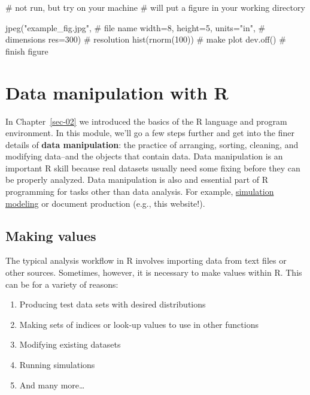 \documentclass[
  13,
  letterpaper,
]{report}
\newenvironment{Shaded}{\begin{snugshade}}{\end{snugshade}}
\newcommand{\AttributeTok}[1]{\textcolor[rgb]{0.40,0.45,0.13}{#1}}
\newcommand{\CommentTok}[1]{\textcolor[rgb]{0.37,0.37,0.37}{#1}}
\newcommand{\DecValTok}[1]{\textcolor[rgb]{0.68,0.00,0.00}{#1}}
\newcommand{\FunctionTok}[1]{\textcolor[rgb]{0.28,0.35,0.67}{#1}}
\newcommand{\NormalTok}[1]{\textcolor[rgb]{0.00,0.23,0.31}{#1}}
\newcommand{\StringTok}[1]{\textcolor[rgb]{0.13,0.47,0.30}{#1}}
\begin{document}
\begin{Shaded}
\begin{Highlighting}[]
\CommentTok{\# not run, but try on your machine}
\CommentTok{\# will put a figure in your working directory}

\FunctionTok{jpeg}\NormalTok{(}\StringTok{"example\_fig.jpg"}\NormalTok{,             }\CommentTok{\# file name}
     \AttributeTok{width=}\DecValTok{8}\NormalTok{, }\AttributeTok{height=}\DecValTok{5}\NormalTok{, }\AttributeTok{units=}\StringTok{"in"}\NormalTok{, }\CommentTok{\# dimensions}
     \AttributeTok{res=}\DecValTok{300}\NormalTok{)                       }\CommentTok{\# resolution}
\FunctionTok{hist}\NormalTok{(}\FunctionTok{rnorm}\NormalTok{(}\DecValTok{100}\NormalTok{))                    }\CommentTok{\# make plot}
\FunctionTok{dev.off}\NormalTok{()                           }\CommentTok{\# finish figure}
\end{Highlighting}
\end{Shaded}

\chapter{Data manipulation with R}\label{sec-05}

In Chapter~\ref{sec-02} we introduced the basics of the R language and
program environment. In this module, we'll go a few steps further and
get into the finer details of \textbf{data manipulation}: the practice
of arranging, sorting, cleaning, and modifying data--and the objects
that contain data. Data manipulation is an important R skill because
real datasets usually need some fixing before they can be properly
analyzed. Data manipulation is also and essential part of R programming
for tasks other than data analysis. For example,
\href{https://doi.org/10.5066/P935Y7NO}{simulation modeling} or document
production (e.g., this website!).

\section{Making values}\label{sec-05-make}

The typical analysis workflow in R involves importing data from text
files or other sources. Sometimes, however, it is necessary to make
values within R. This can be for a variety of reasons:

\begin{enumerate}
\def\labelenumi{\arabic{enumi}.}
\item
  Producing test data sets with desired distributions
\item
  Making sets of indices or look-up values to use in other functions
\item
  Modifying existing datasets
\item
  Running simulations
\item
  And many more\ldots{}
\end{enumerate}
\end{document}
